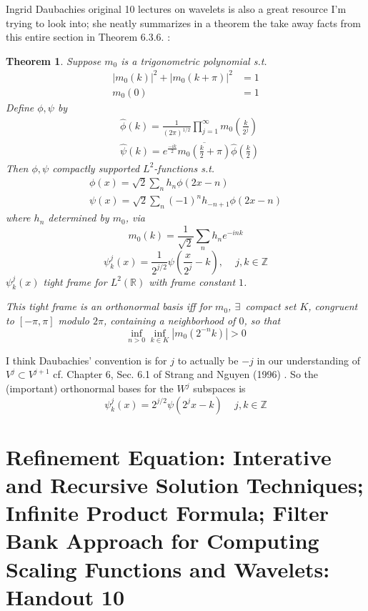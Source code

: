 \documentclass[twoside]{amsart}
\theoremstyle{plain}
\newtheorem{theorem}{Theorem}
\theoremstyle{definition}
\theoremstyle{remark}
\numberwithin{equation}{section}
\begin{document}
Ingrid Daubachies original 10 lectures on wavelets is also a great resource I'm trying to look into; she neatly summarizes in a theorem the take away facts from this entire section in Theorem 6.3.6. \cite{IDaubechies1992}:
\begin{theorem}
Suppose $m_0$ is a trigonometric polynomial s.t. 
\[
\begin{aligned}
 |m_0(k)|^2 + |m_0(k + \pi)|^2  & = 1 \\  
m_0(0)  & = 1 
\end{aligned}
\]
Define $\phi, \psi$ by 
\[
\begin{aligned}
  & \widehat{\phi}(k) = \frac{1}{ (2\pi)^{1/2}} \prod_{j=1}^{\infty} m_0\left( \frac{k}{2^j} \right) \\
  &  \widehat{\psi}(k) = e^{\frac{-ik}{2} } \overline{m_0\left(\frac{k}{2} + \pi \right)} \widehat{\phi}\left( \frac{k}{2} \right)
\end{aligned}
\]
Then $\phi,\psi$ compactly supported $L^2$-functions s.t. 
\[
\begin{gathered}
\phi(x) = \sqrt{2} \sum_n h_n\phi(2x-n) \\
\psi(x) = \sqrt{2} \sum_n (-1)^n h_{-n+1} \phi(2x-n) \end{gathered}
\]
where $h_n$ determined by $m_0$, via
\[
m_0(k) = \frac{1}{\sqrt{2}} \sum_n h_n e^{-{ink} }
\]
\[
\psi^j_k(x) = \frac{1}{2^{j/2}} \psi(\frac{x}{2^j} - k ) , \quad \, j,k \in \mathbb{Z}
\]
$\psi^j_k(x)$ tight frame for $L^2(\mathbb{R})$ with frame constant $1$.  

This tight frame is an orthonormal basis iff for $m_0$, $\exists \,$ compact set $K$, congruent to $[-\pi,\pi]$ modulo $2\pi$, containing a neighborhood of $0$, so that 
\[
\inf_{n>0} \inf_{k \in K} | m_0(2^{-n}k) | > 0 
\]

\end{theorem}
I think Daubachies' convention is for $j$ to actually be $-j$ in our understanding of $V^j \subset V^{j+1}$ cf. Chapter 6, Sec. 6.1 of Strang and Nguyen (1996) \cite{GStrangTNguyen1996}.  So the (important) orthonormal bases for the $W^j$ subspaces is 
\begin{equation}
\psi^j_k(x) = 2^{j/2} \psi(2^jx - k ) \quad \, j,k \in \mathbb{Z}
\end{equation}


\section{Refinement Equation: Interative and Recursive Solution Techniques; Infinite Product Formula; Filter Bank Approach for Computing Scaling Functions and Wavelets: Handout 10}
\end{document}
